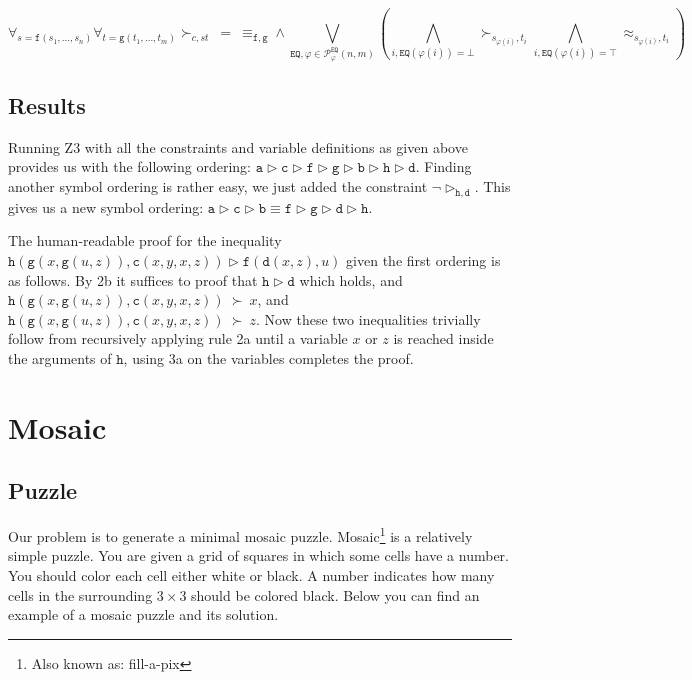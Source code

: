 \documentclass{scrartcl}
\begin{document}
$$\forall_{s = \mathtt{f}(s_1, \dots, s_n)} \forall_{t = \mathtt{g}(t_1, \dots,
t_m)} \succ_{c,st}\ =\ \equiv_{\mathtt{f,g}} \land \bigvee_{\mathtt{EQ},
\varphi \in \mathcal{P}^\mathtt{EQ}_\varphi(n, m)}
\left(
	\bigwedge_{i,\mathtt{EQ}(\varphi(i)) = \bot} \succ_{s_{\varphi(i)},t_i}
	\bigwedge_{i,\mathtt{EQ}(\varphi(i)) = \top} \approx_{s_{\varphi(i)},t_i}
\right)
$$
\subsection{Results}
Running Z3 with all the constraints and variable definitions as given above
provides us with the following ordering: $\mathtt{a \rhd c \rhd f \rhd g \rhd b
\rhd h \rhd d }$. Finding another symbol ordering is rather easy, we just added
the constraint $\mathtt{\neg \rhd_{h,d}}$. This gives us a new symbol ordering:
$\mathtt{a \rhd c \rhd b \equiv f \rhd g \rhd d \rhd h}$.

The human-readable proof for the inequality
$\mathtt{h}(\mathtt{g}(x,\mathtt{g}(u,z)),\mathtt{c}(x,y,x,z)) \rhd
\mathtt{f}(\mathtt{d}(x,z),u)$ given the first ordering is as follows.
By 2b it suffices to proof that $\mathtt{h \rhd d}$ which holds, and
$\mathtt{h}(\mathtt{g}(x,\mathtt{g}(u,z)),\mathtt{c}(x,y,x,z))~\succ~x$, and
$\mathtt{h}(\mathtt{g}(x,\mathtt{g}(u,z)),\mathtt{c}(x,y,x,z))~\succ~z$. Now
these two inequalities trivially follow from recursively applying rule 2a until
a variable $x$ or $z$ is reached inside the arguments of $\mathtt{h}$, using 3a
on the variables completes the proof.

\pagebreak
\section{Mosaic} %
\label{sec:mosaic}
	\subsection{Puzzle} %
	\label{sub:puzzle}
	Our problem is to generate a minimal mosaic puzzle.
	Mosaic\footnote{Also known as: fill-a-pix} is a relatively simple puzzle.
	You are given a grid of squares in which some cells have a number.
	You should color each cell either white or black.
	A number indicates how many cells in the surrounding $3\times3$ should be colored black.
	Below you can find an example of a mosaic puzzle and its solution.

	\begin{figure}[H]
		\centering
		
	\end{figure}
\end{document}
